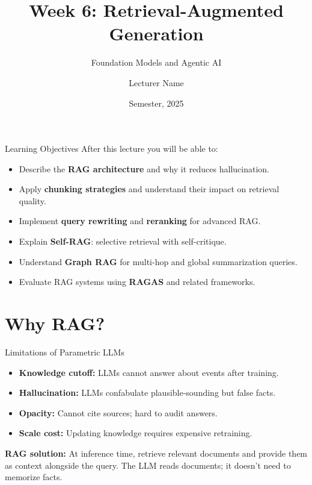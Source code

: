 \documentclass[aspectratio=169,10pt]{beamer}
\title{Week 6: Retrieval-Augmented Generation}
\subtitle{Foundation Models and Agentic AI}
\author{Lecturer Name}
\institute{Holon Institute of Technology (HIT)}
\date{Semester, 2025}
\begin{document}
\begin{frame}
  \titlepage
\end{frame}

\begin{frame}{Learning Objectives}
  After this lecture you will be able to:
  \begin{itemize}
    \item Describe the \textbf{RAG architecture} and why it reduces hallucination.
    \item Apply \textbf{chunking strategies} and understand their impact on retrieval quality.
    \item Implement \textbf{query rewriting} and \textbf{reranking} for advanced RAG.
    \item Explain \textbf{Self-RAG}: selective retrieval with self-critique.
    \item Understand \textbf{Graph RAG} for multi-hop and global summarization queries.
    \item Evaluate RAG systems using \textbf{RAGAS} and related frameworks.
  \end{itemize}
\end{frame}

\section{Why RAG?}

\begin{frame}{Limitations of Parametric LLMs}
  \begin{tcolorbox}[alertbox, title=Core Problems]
    \begin{itemize}
      \item \textbf{Knowledge cutoff:} LLMs cannot answer about events after training.
      \item \textbf{Hallucination:} LLMs confabulate plausible-sounding but false facts.
      \item \textbf{Opacity:} Cannot cite sources; hard to audit answers.
      \item \textbf{Scale cost:} Updating knowledge requires expensive retraining.
    \end{itemize}
  \end{tcolorbox}
  \vspace{0.4em}
  \textbf{RAG solution:} At inference time, retrieve relevant documents and provide them as
  context alongside the query. The LLM reads documents; it doesn't need to memorize facts.
\end{frame}
\end{document}
